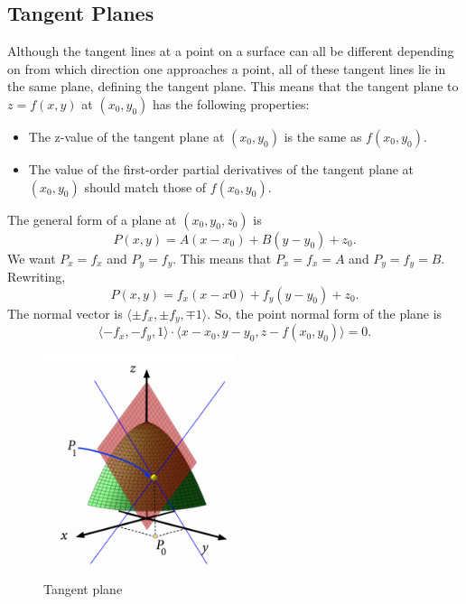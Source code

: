 \subsection{Tangent Planes}
\noindent
Although the tangent lines at a point on a surface can all be different depending on from which direction one approaches a point, all of these tangent lines lie in the same plane, defining the tangent plane.
This means that the tangent plane to $z = f(x, y)$ at $(x_0,y_0)$ has the following properties:
\begin{itemize}
	\item The z-value of the tangent plane at $(x_0, y_0)$ is the same as $f(x_0, y_0)$.
	\item The value of the first-order partial derivatives of the tangent plane at $(x_0, y_0)$ should match those of $f(x_0, y_0)$.
\end{itemize}

\noindent
The general form of a plane at $(x_0, y_0, z_0)$ is
\begin{equation*}
	P(x,y) = A(x-x_0) + B(y-y_0) + z_0.
\end{equation*}
We want $P_x = f_x$ and $P_y = f_y$.
This means that $P_x = f_x = A$ and $P_y = f_y = B$.
Rewriting,
\begin{equation*}
	P(x,y) = f_x(x-x0) + f_y(y-y_0) + z_0.
\end{equation*} 
The normal vector is $\langle \pm f_x,\pm f_y, \mp 1\rangle$.
So, the point normal form of the plane is 
\begin{equation*}
	\langle -f_x, -f_y, 1\rangle \cdot \langle x-x_0, y-y_0, z-f(x_0,y_0) \rangle = 0.
\end{equation*}

\begin{figure}[H]
	\centering
	\includegraphics[width=0.5\textwidth]{./Images/differentialMultivariableCalculus/tangent_plane.png}
	\caption{Tangent plane}
\end{figure}
